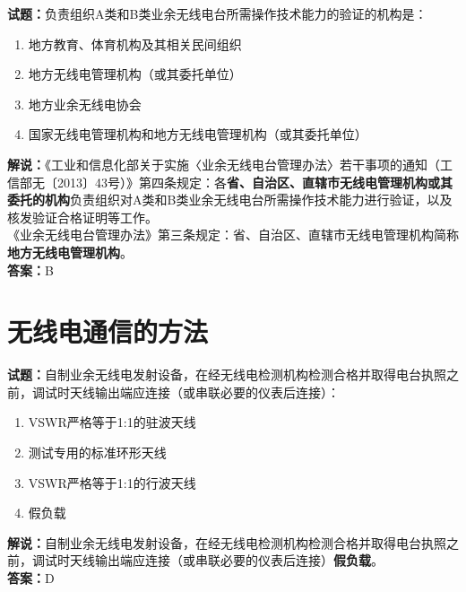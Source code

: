 \documentclass{ctexbook}
\begin{document}
\bigskip


\noindent\textbf{试题：}负责组织A类和B类业余无线电台所需操作技术能力的验证的机构是：
\begin{enumerate}[leftmargin=3em]
\item 地方教育、体育机构及其相关民间组织
\item 地方无线电管理机构（或其委托单位）
\item 地方业余无线电协会
\item 国家无线电管理机构和地方无线电管理机构（或其委托单位）
\end{enumerate}
\noindent\textbf{解说：}《工业和信息化部关于实施〈业余无线电台管理办法〉若干事项的通知（工信部无〔2013〕43号）》第四条规定：各\textbf{省、自治区、直辖市无线电管理机构或其委托的机构}负责组织对A类和B类业余无线电台所需操作技术能力进行验证，以及核发验证合格证明等工作。\\《业余无线电台管理办法》第三条规定：省、自治区、直辖市无线电管理机构简称\textbf{地方无线电管理机构}。\\\noindent\textbf{答案：}B










\chapter{无线电通信的方法}

\newpage

\noindent\textbf{试题：}自制业余无线电发射设备，在经无线电检测机构检测合格并取得电台执照之前，调试时天线输出端应连接（或串联必要的仪表后连接）：
\begin{enumerate}[leftmargin=3em]
\item VSWR严格等于1:1的驻波天线
\item 测试专用的标准环形天线
\item VSWR严格等于1:1的行波天线
\item 假负载
\end{enumerate}
\noindent\textbf{解说：}自制业余无线电发射设备，在经无线电检测机构检测合格并取得电台执照之前，调试时天线输出端应连接（或串联必要的仪表后连接）\textbf{假负载}。\\\noindent\textbf{答案：}D



\bigskip
\end{document}
